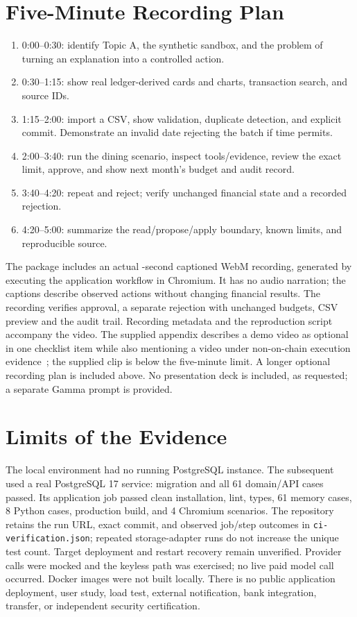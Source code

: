 \documentclass[conference,a4paper]{IEEEtran}
\begin{document}
\section{Five-Minute Recording Plan}
\begin{enumerate}
\item 0:00--0:30: identify Topic A, the synthetic sandbox, and the problem of turning an explanation into a controlled action.
\item 0:30--1:15: show real ledger-derived cards and charts, transaction search, and source IDs.
\item 1:15--2:00: import a CSV, show validation, duplicate detection, and explicit commit. Demonstrate an invalid date rejecting the batch if time permits.
\item 2:00--3:40: run the dining scenario, inspect tools/evidence, review the exact limit, approve, and show next month's budget and audit record.
\item 3:40--4:20: repeat and reject; verify unchanged financial state and a recorded rejection.
\item 4:20--5:00: summarize the read/propose/apply boundary, known limits, and reproducible source.
\end{enumerate}
The package includes an actual \DemoSeconds{}-second captioned WebM recording, generated by executing the application workflow in Chromium. It has no audio narration; the captions describe observed actions without changing financial results. The recording verifies approval, a separate rejection with unchanged budgets, CSV preview and the audit trail. Recording metadata and the reproduction script accompany the video. The supplied appendix describes a demo video as optional in one checklist item while also mentioning a video under non-on-chain execution evidence~\cite{competition}; the supplied clip is below the five-minute limit. A longer optional recording plan is included above. No presentation deck is included, as requested; a separate Gamma prompt is provided.

\section{Limits of the Evidence}
The local environment had no running PostgreSQL instance. The subsequent \VerifiedCI{} used a real PostgreSQL 17 service: migration and all 61 domain/API cases passed. Its application job passed clean installation, lint, types, 61 memory cases, 8 Python cases, production build, and 4 Chromium scenarios. The repository retains the run URL, exact commit, and observed job/step outcomes in \texttt{ci-verification.json}; repeated storage-adapter runs do not increase the unique test count. Target deployment and restart recovery remain unverified. Provider calls were mocked and the keyless path was exercised; no live paid model call occurred. Docker images were not built locally. There is no public application deployment, user study, load test, external notification, bank integration, transfer, or independent security certification.
\end{document}

